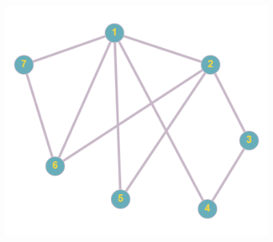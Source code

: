 \documentclass[a4paper,14pt]{extarticle}
\begin{document}
\begin{enumerate}[1.]
\begin{center}
              \includegraphics[width=100mm]{G1diagram}
          \end{center}\bigbreak


\end{enumerate}
\end{document}

